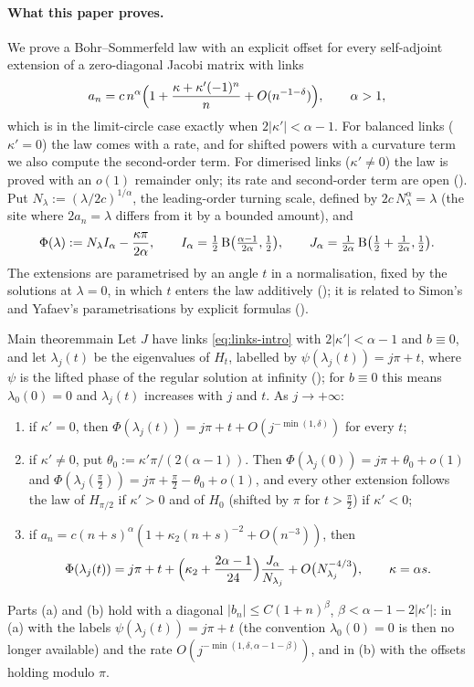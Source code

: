 \paragraph{What this paper proves.} We prove a Bohr--Sommerfeld law with an explicit offset for
every self-adjoint extension of a zero-diagonal Jacobi matrix with links
\begin{equation}\label{eq:links-intro}
  a_n=c\,n^\alpha\Bigl(1+\frac{\kappa+\kappa'(-1)^n}{n}+O(n^{-1-\delta})\Bigr),\qquad\alpha>1,
\end{equation}
which is in the limit-circle case exactly when $2|\kappa'|<\alpha-1$. For balanced links
($\kappa'=0$) the law comes with a rate, and for shifted powers with a curvature term we also
compute the second-order term. For dimerised links ($\kappa'\ne0$) the law is proved with an $o(1)$
remainder only; its rate and second-order term are open (). Put
$N_\lambda:=(\lambda/2c)^{1/\alpha}$, the leading-order turning scale, defined by
$2c\,N_\lambda^\alpha=\lambda$ (the site where $2a_n=\lambda$ differs from it by a bounded amount), and
\[
  \Phi(\lambda):=N_\lambda I_\alpha-\frac{\kappa\pi}{2\alpha},\qquad
  I_\alpha=\tfrac12\operatorname{B}\bigl(\tfrac{\alpha-1}{2\alpha},\tfrac12\bigr),\qquad
  J_\alpha=\tfrac1{2\alpha}\operatorname{B}\bigl(\tfrac12+\tfrac1{2\alpha},\tfrac12\bigr).
\]
The extensions are parametrised by an angle $t$ in a normalisation, fixed by the solutions
at $\lambda=0$, in which $t$ enters the law additively (); it is related
to Simon's and Yafaev's parametrisations by explicit formulas ().

\begin{theorem}{Main theorem}{main}
Let $J$ have links \eqref{eq:links-intro} with $2|\kappa'|<\alpha-1$ and $b\equiv0$, and let
$\lambda_j(t)$ be the eigenvalues of $H_t$, labelled by $\psi(\lambda_j(t))=j\pi+t$, where $\psi$ is the lifted
phase of the regular solution at infinity ();
for $b\equiv0$ this means $\lambda_0(0)=0$ and $\lambda_j(t)$ increases with $j$ and $t$. As $j\to+\infty$:
\begin{enumerate}
\item[(a)] if $\kappa'=0$, then $\Phi(\lambda_j(t))=j\pi+t+O(j^{-\min(1,\delta)})$ for every $t$;
\item[(b)] if $\kappa'\ne0$, put $\theta_0:=\kappa'\pi/(2(\alpha-1))$. Then
  $\Phi(\lambda_j(0))=j\pi+\theta_0+o(1)$ and $\Phi(\lambda_j(\frac\pi2))=j\pi+\frac\pi2-\theta_0+o(1)$, and
  every other extension follows the law of $H_{\pi/2}$ if $\kappa'>0$ and of $H_0$ (shifted by
  $\pi$ for $t>\frac\pi2$) if $\kappa'<0$;
\item[(c)] if $a_n=c(n+s)^\alpha(1+\kappa_2(n+s)^{-2}+O(n^{-3}))$, then
  \[
    \Phi(\lambda_j(t))=j\pi+t+\Bigl(\kappa_2+\frac{2\alpha-1}{24}\Bigr)\frac{J_\alpha}{N_{\lambda_j}}+O\bigl(N_{\lambda_j}^{-4/3}\bigr),
    \qquad\kappa=\alpha s .
  \]
\end{enumerate}
Parts (a) and (b) hold with a diagonal $|b_n|\le C(1+n)^\beta$, $\beta<\alpha-1-2|\kappa'|$: in (a) with the
labels $\psi(\lambda_j(t))=j\pi+t$ (the convention $\lambda_0(0)=0$ is then no longer available) and the
rate $O(j^{-\min(1,\delta,\alpha-1-\beta)})$, and in (b) with the offsets holding modulo $\pi$.
\end{theorem}

